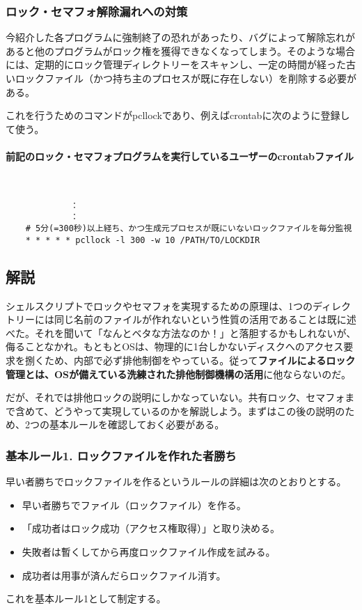 \subsubsection*{ロック・セマフォ解除漏れへの対策}
今紹介した各プログラムに強制終了の恐れがあったり、バグによって解除忘れがあると他のプログラムがロック権を獲得できなくなってしまう。そのような場合には、定期的にロック管理ディレクトリーをスキャンし、一定の時間が経った古いロックファイル（かつ持ち主のプロセスが既に存在しない）を削除する必要がある。

これを行うためのコマンドがpcllockであり、例えばcrontabに次のように登録して使う。
\paragraph{前記のロック・セマフォプログラムを実行しているユーザーのcrontabファイル}　\\
\begin{frameboxit}{160.0mm}
\begin{verbatim}
	         ：
	         ：
	# 5分(=300秒)以上経ち、かつ生成元プロセスが既にいないロックファイルを毎分監視
	* * * * * pcllock -l 300 -w 10 /PATH/TO/LOCKDIR
\end{verbatim}
\end{frameboxit}

\subsection*{解説}

シェルスクリプトでロックやセマフォを実現するための原理は、1つのディレクトリーには同じ名前のファイルが作れないという性質の活用であることは既に述べた。それを聞いて「なんとベタな方法なのか！」と落胆するかもしれないが、侮ることなかれ。もともとOSは、物理的に1台しかないディスクへのアクセス要求を捌くため、内部で必ず排他制御をやっている。従って\textbf{ファイルによるロック管理とは、OSが備えている洗練された排他制御機構の活用}に他ならないのだ。

だが、それでは排他ロックの説明にしかなっていない。共有ロック、セマフォまで含めて、どうやって実現しているのかを解説しよう。まずはこの後の説明のため、2つの基本ルールを確認しておく必要がある。

\subsubsection*{基本ルール1. ロックファイルを作れた者勝ち}
早い者勝ちでロックファイルを作るというルールの詳細は次のとおりとする。
\begin{itemize}
  \item 早い者勝ちでファイル（ロックファイル）を作る。
  \item 「成功者はロック成功（アクセス権取得）」と取り決める。
  \item 失敗者は暫くしてから再度ロックファイル作成を試みる。
  \item 成功者は用事が済んだらロックファイル消す。
\end{itemize}
これを基本ルール1として制定する。


